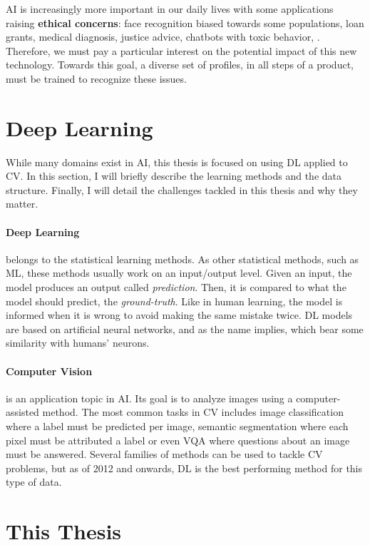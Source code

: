 \ac{AI} is increasingly more important in our daily lives with some applications raising \textbf{ethical
      concerns}: face recognition biased towards some populations, loan grants, medical diagnosis, justice
advice, chatbots with toxic behavior, \etc. Therefore, we must pay a particular interest on the
potential impact of this new technology. Towards this goal, a diverse set of profiles, in all steps
of a product, must be trained to recognize these issues.

\section{Deep Learning}

While many domains exist in \acf{AI}, this thesis is focused on using \acf{DL} applied to \acf{CV}.
In this section, I will briefly describe the learning methods and the data structure.
Finally, I will detail the challenges tackled in this thesis and why they matter.

\paragraph{Deep Learning} belongs to the statistical learning methods. As other statistical methods,
such as \acf{ML}, these methods usually work on an input/output level. Given an input, the model
produces an output called \textit{prediction}. Then, it is compared to what the model should
predict, \ie the \textit{ground-truth}. Like in human learning, the model is informed when it is
wrong to avoid making the same mistake twice. \acf{DL} models are based on artificial neural
networks, and as the name implies, which bear some similarity with humans' neurons.

\paragraph{Computer Vision} is an application topic in \acf{AI}. Its goal is to analyze images using
a computer-assisted method. The most common tasks in \acf{CV} includes image classification where a
label must be predicted per image, semantic segmentation where each pixel must be attributed a label
or even \ac{VQA} where questions about an image must be answered. Several families of methods can be
used to tackle \ac{CV} problems, but as of 2012 and onwards, \acf{DL} is the best performing method
for this type of data.

\section{This Thesis}

